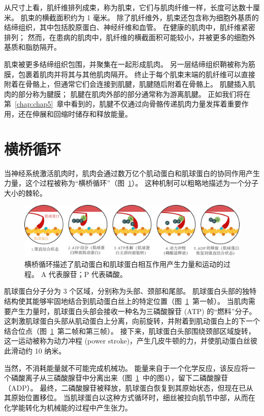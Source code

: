 从尺寸上看，肌纤维排列成束，称为肌束，它们与肌肉纤维一样，长度可达数十厘米。
肌束的横截面积约为 1 毫米。
除了肌纤维外，肌束还包含称为细胞外基质的结缔组织，其中包括胶原蛋白、神经纤维和血管。
在健康的肌肉中，肌纤维紧密排列；
然而，在患病的肌肉中，肌纤维的横截面积可能较小，并被更多的细胞外基质和脂肪隔开。


肌束被更多结缔组织包围，并聚集在一起形成肌肉。
另一层结缔组织鞘被称为筋膜，包裹着肌肉并将其与其他肌肉隔开。
终止于每个肌束末端的肌纤维可以直接附着在骨骼上，但通常它们会连接到肌腱，肌腱随后附着在骨骼上。
肌腱插入肌肉的部分称为腱膜；
肌腱在肌肉外部的部分通常称为游离肌腱。
正如我们将在第~\ref{chap:chap5}~章中看到的，肌腱不仅通过向骨骼传递肌肉力量发挥着重要作用，还在伸展和回缩时储存和释放能量。


\section{横桥循环}

当神经系统激活肌肉时，肌肉会通过数万亿个肌动蛋白和肌球蛋白的协同作用产生力量，这个过程被称为“横桥循环”（图~\ref{fig:4_3}）。
这种机制可以粗略地描述为一个分子大小的棘轮。


\begin{figure}[!htb]
	\centering
	\includegraphics[width=1.0\linewidth]{chap4/4_3}
	\caption{横桥循环描述了肌动蛋白和肌球蛋白相互作用产生力量和运动的过程。
		A 代表腺苷；P 代表磷酸。 \label{fig:4_3}}
\end{figure}

肌球蛋白分子分为 3 个区域，分别称为头部、颈部和尾部。
肌球蛋白头部的独特结构使其能够牢固地结合到肌动蛋白丝上的特定位置（图~\ref{fig:4_3}~第一帧）。
当肌肉需要产生力量时，肌球蛋白头部会接收一种名为三磷酸腺苷 (ATP) 的“燃料”分子。
这刺激肌球蛋白头部从肌动蛋白上分离，向前旋转，并附着到肌动蛋白上的下一个结合位点（图~\ref{fig:4_3}~第二帧和第三帧）。
接下来，肌球蛋白头部围绕颈部区域旋转，这一运动被称为动力冲程 (power stroke)，产生几皮牛顿的力，并使肌动蛋白丝彼此滑动约 10 纳米。


当然，不消耗能量就不可能完成机械功。
能量来自于一个化学反应，该反应将一个磷酸离子从三磷酸腺苷中分离出来（图~\ref{fig:4_3}~中的图4），留下二磷酸腺苷（ADP）。
最终，二磷酸腺苷被释放，肌球蛋白恢复到其原始状态，但现在已从其原始位置移位。
当肌球蛋白以这种方式循环时，细丝被拉向肌节中部，从而在化学能转化为机械能的过程中产生张力。


